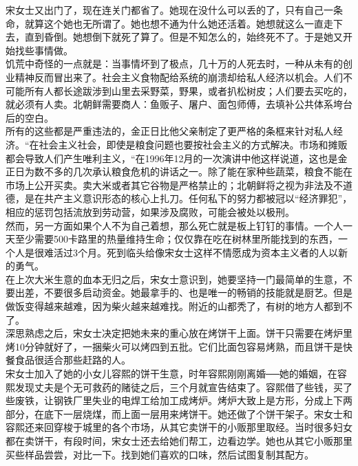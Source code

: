 宋女士又出门了，现在连关门都省了。她现在没什么可以丢的了，只有自己一条命，就算这个她也无所谓了。她也想不通为什么她还活着。她想就这么一直走下去，直到昏倒。她想倒下就死了算了。但是不知怎么的，始终死不了。于是她又开始找些事情做。\\

饥荒中奇怪的一点就是：当事情坏到了极点，几十万的人死去时，一种从未有的创业精神反而冒出来了。社会主义食物配给系统的崩溃却给私人经济以机会。人们不可能所有人都长途跋涉到山里去采野菜，野果，或者扒松树皮；人们要去买吃的，就必须有人卖。北朝鲜需要商人：鱼贩子、屠户、面包师傅，去填补公共体系垮台后的空白。\\

所有的这些都是严重违法的，金正日比他父亲制定了更严格的条框来针对私人经济。“在社会主义社会，即使是粮食问题也要按社会主义的方式解决。市场和摊贩都会导致人们产生唯利主义，“在1996年12月的一次演讲中他这样说道，这也是金正日为数不多的几次承认粮食危机的讲话之一。除了能在家种些蔬菜，粮食不能在市场上公开买卖。卖大米或者其它谷物是严格禁止的；北朝鲜将之视为非法及不道德，是在共产主义意识形态的核心上扎刀。任何私下的努力都被冠以“经济罪犯”，相应的惩罚包括流放到劳动营，如果涉及腐败，可能会被处以极刑。\\

然而，另一方面如果个人不为自己着想，那么死亡就是板上钉钉的事情。一个人一天至少需要500卡路里的热量维持生命；仅仅靠在吃在树林里所能找到的东西，一个人是很难活过3个月。死到临头给像宋女士这样不情愿成为资本主义者的人以新的勇气。\\

在上次大米生意的血本无归之后，宋女士意识到，她要坚持一门最简单的生意，不要出差，不要很多启动资金。她最拿手的、也是唯一的畅销的技能就是厨艺。但是做饭变得越来越难，因为柴火越来越难找。附近的山都秃了，有树的地方人都到不了。\\

深思熟虑之后，宋女士决定把她未来的重心放在烤饼干上面。饼干只需要在烤炉里烤10分钟就好了，一捆柴火可以烤四到五批。它们比面包容易烤熟，而且饼干是快餐食品很适合那些赶路的人。\\

宋女士加入了她的小女儿容熙的饼干生意，时年容熙刚刚离婚──她的婚姻，在容熙发现丈夫是个无可救药的赌徒之后，三个月就宣告结束了。容熙借了些钱，买了些废铁，让钢铁厂里失业的电焊工给加工成烤炉。烤炉大致上是方形，分成上下两部分，在底下一层烧煤，而上面一层用来烤饼干。她还做了个饼干架子。宋女士和容熙还来回穿梭于城里的各个市场，从其它卖饼干的小贩那里取经。当时很多妇女都在卖饼干，有段时间，宋女士还去给她们帮工，边看边学。她也从其它小贩那里买些样品尝尝，对比一下。找到她们喜欢的口味，然后试图复制其配方。\\

